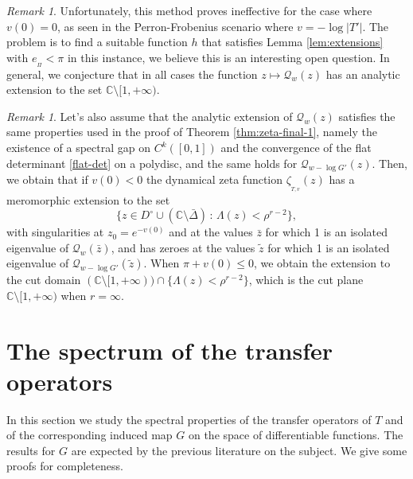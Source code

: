 \documentclass[11pt]{amsart}
\theoremstyle{definition}
\theoremstyle{remark}
\newtheorem{rem}[theorem]{Remark}
\theoremstyle{definition}
\numberwithin{equation}{section}
\newcommand{\C}{\mathbb C}
\newcommand{\QQ}{\mathcal{Q}}
\newcommand{\dynzeta}[1]{\zeta_{_{#1}}}
\begin{document}
\begin{rem} \label{rem:peccato}
Unfortunately, this method proves ineffective for the case where $v(0)=0$, as seen in the Perron-Frobenius scenario where $v = -\log |T'|$. The problem is to find a suitable function $h$ that satisfies Lemma \ref{lem:extensions} with $e_{_\Pi}<\pi$ in this instance, we believe this is an interesting open question. In general, we conjecture that in all cases the {function $z\mapsto \QQ_w(z)$ has an analytic extension to the set $\C\setminus [1,+\infty)$.}
\end{rem}

{
\begin{rem} \label{rem:zeta-ext}
Let's also assume that the analytic extension of $\QQ_w(z)$ satisfies the same properties used in the proof of Theorem \ref{thm:zeta-final-1}, namely the existence of a spectral gap on $C^k([0,1])$ and the convergence of the flat determinant \eqref{flat-det} on a polydisc, and the same holds for $\QQ_{w-\log G'}(z)$. Then, we obtain that if $v(0)<0$ the dynamical zeta function $\dynzeta{T,v}(z)$ has a meromorphic extension to the set 
\[
\{z\in D^\circ \cup (\C\setminus \bar{\Delta})\, :\, \Lambda(z)<\rho^{r-2} \},
\] 
with singularities at $z_0 = e^{-v(0)}$ and at the values $\bar z$ for which 1 is an isolated eigenvalue of $\QQ_w(\bar z)$, and has zeroes at the values $\tilde z$ for which 1 is an isolated eigenvalue of $\QQ_{w-\log G'}(\tilde z)$. When $\pi+v(0)\le 0$, we obtain the extension to the cut domain $(\C\setminus [1,+\infty)) \cap \{\Lambda(z)<\rho^{r-2}\}$, which is the cut plane $\C\setminus [1,+\infty)$ when $r=\infty$.
\end{rem}
}




\section{The spectrum of the transfer operators} \label{sec:spectrum}
In this section we study the spectral properties of the transfer operators of $T$ and of the corresponding induced map $G$ on the space of differentiable functions. The results for $G$ are expected by the previous literature on the subject. We give some proofs for completeness. 
\end{document}
